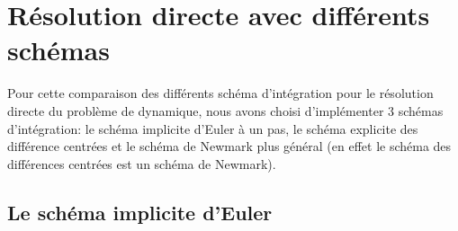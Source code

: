 \documentclass[]{article}
\begin{document}
\pagestyle{empty} 

\section{Résolution directe avec différents schémas}

Pour cette comparaison des différents schéma d'intégration pour le résolution
directe du problème de dynamique, nous avons choisi d'implémenter 3 schémas
d'intégration: le schéma implicite d'Euler à un pas, le schéma explicite des
différence centrées et le schéma de Newmark plus général (en effet le schéma
des différences centrées est un schéma de Newmark).

\subsection{Le schéma implicite d'Euler}
\end{document}
